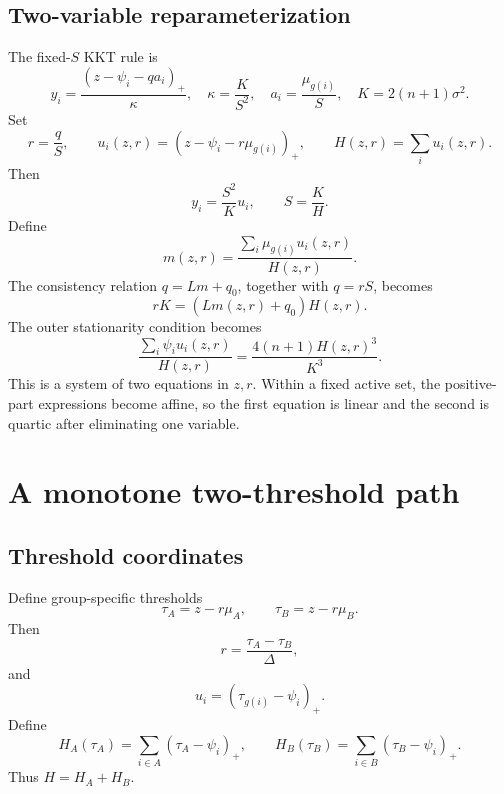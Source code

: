 \documentclass[11pt,a4paper]{article}
\newcommand{\1}{\mathbf{1}}
\begin{document}
\subsection{Two-variable reparameterization}

The fixed-\(S\) KKT rule is
\[
y_i=\frac{(z-\psi_i-q a_i)_+}{\kappa},
\quad
\kappa=\frac{K}{S^2},
\quad
a_i=\frac{\mu_{g(i)}}{S},
\quad
K=2(n+1)\sigma^2.
\]
Set
\[
r=\frac qS,
\qquad
u_i(z,r)=(z-\psi_i-r\mu_{g(i)})_+,
\qquad
H(z,r)=\sum_i u_i(z,r).
\]
Then
\begin{equation}
  y_i=\frac{S^2}{K}u_i,
  \qquad
  S=\frac K H.
  \label{eq:S-H}
\end{equation}
Define
\begin{equation}
  m(z,r)=
  \frac{\sum_i\mu_{g(i)}u_i(z,r)}{H(z,r)}.
\end{equation}
The consistency relation \(q=Lm+q_0\), together with \(q=rS\),
becomes
\begin{equation}
  \boxed{rK=(Lm(z,r)+q_0)H(z,r).}
  \label{eq:consistency-zr}
\end{equation}
The outer stationarity condition becomes
\begin{equation}
  \boxed{
  \frac{\sum_i\psi_i u_i(z,r)}{H(z,r)}
  =\frac{4(n+1)H(z,r)^3}{K^3}.
  }
  \label{eq:outer-zr}
\end{equation}
This is a system of two equations in \(z,r\). Within a fixed active set,
the positive-part expressions become affine, so the first equation is
linear and the second is quartic after eliminating one variable.

\section{A monotone two-threshold path}

\subsection{Threshold coordinates}

Define group-specific thresholds
\begin{equation}
  \tau_A=z-r\mu_A,
  \qquad
  \tau_B=z-r\mu_B.
  \label{eq:thresholds}
\end{equation}
Then
\begin{equation}
  r=\frac{\tau_A-\tau_B}{\Delta},
\end{equation}
and
\begin{equation}
  u_i=(\tau_{g(i)}-\psi_i)_+.
\end{equation}
Define
\begin{equation}
  H_A(\tau_A)=\sum_{i\in A}(\tau_A-\psi_i)_+,
  \qquad
  H_B(\tau_B)=\sum_{i\in B}(\tau_B-\psi_i)_+.
\end{equation}
Thus \(H=H_A+H_B\).
\end{document}
